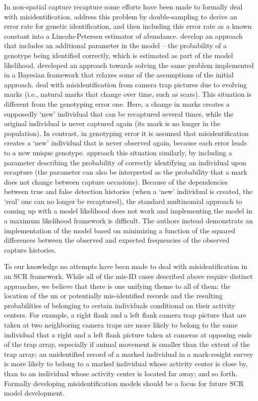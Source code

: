 In non-spatial capture recapture some efforts have been made to
formally deal with misidentification. \citet{stevick_etal:2001}
address this problem by double-sampling to derive an error rate for
genetic identification, and then including this error rate as a known
constant into a Lincoln-Petersen estimator of
abundance. \citet{lukacs_burnham:2005} develop an approach that
includes an additional parameter in the model -- the probability of a
genotype being identified correctly, which is estimated as part of the
model likelihood. \citet{link_etal:2010} developed an approach towards
solving the same problem implemented in a Bayesian framework that
relaxes some of the assumptions of the initial approach.
\citet{yoshizaki_etal:2009} deal with misidentification from camera
trap pictures due to evolving marks (i.e., natural marks that change
over time, such as scars). This situation is different from the
genotyping error one. Here, a change in marks creates a supposedly
`new' individual that can be recaptured several times, while the
original individual is never captured again (its mark is no longer in
the population). In contrast, in genotyping error it is assumed that
misidentification creates a `new' individual that is never observed
again, because each error leads to a new unique
genotype. \citet{yoshizaki_etal:2009} approach this situation
similarly, by including a parameter describing the probability of
correctly identifying an individual upon recapture (the parameter can
also be interpreted as the probability that a mark does not change
between capture occasions). Because of the dependencies between true
and false detection histories (when a `new' individual is created, the
`real' one can no longer be recaptured), the standard multinomial
approach to coming up with a model likelihood does not work and
implementing the model in a maximum likelihood framework is
difficult. The authors instead demonstrate an implementation of the
model based on minimizing a function of the squared differences
between the observed and expected frequencies of the observed capture
histories.

To our knowledge no attempts have been made to deal with
misidentification in an SCR framework. While all of the mis-ID cases
described above require distinct approaches, we believe that there is
one unifying theme to all of them: the location of the un or
potentially mis-identified records and the resulting probabilities of
belonging to certain individuals conditional on their activity
centers. For example, a right flank and a left flank camera trap
picture that are taken at two neighboring camera traps are more likely
to belong to the same individual that a right and a left flank picture
taken at cameras at opposing ends of the trap array, especially if
animal movement is smaller than the extent of the trap array; an
unidentified record of a marked individual in a mark-resight survey is
more likely to belong to a marked individual whose activity center is
close by, than to an individual whose activity center is located far
away; and so forth. Formally developing misidentification models
should be a focus for future SCR model development.

